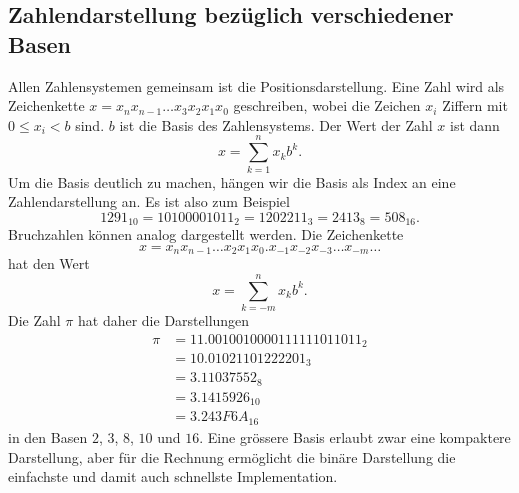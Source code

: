 \subsection{Zahlendarstellung bezüglich verschiedener Basen
\label{buch:subsection:basen}}
Allen Zahlensystemen gemeinsam ist die Positionsdarstellung.
Eine Zahl wird als Zeichenkette $x=x_nx_{n-1}\dots x_3x_2x_1x_0$
geschreiben,
wobei die Zeichen $x_i$ Ziffern mit $0 \le x_i < b$ sind.
$b$ ist die Basis des Zahlensystems.
%
Der Wert der Zahl $x$ ist dann 
\[
x
=
\sum_{k=1}^n x_kb^k.
\]
Um die Basis deutlich zu machen, 
hängen wir die Basis als Index an eine Zahlendarstellung an.
Es ist also zum Beispiel
\[
1291_{10}
=
10100001011_2
=
1202211_3
=
2413_8
=
508_{16}.
\]
Bruchzahlen können analog dargestellt werden.
%
Die Zeichenkette
\[
x = x_{n}x_{n-1}\dots x_2x_1x_0\texttt{.}x_{-1}x_{-2}x_{-3}\dots x_{-m}\dots
\]
hat den Wert
\[
x = \sum_{k=-m}^n x_kb^k.
\]
Die Zahl $\pi$ hat daher die Darstellungen
\index{$\pi$}%
\begin{align*}
\pi
&=
11.0010010000111111011011_2
\\
&=
10.01021101222201_3
\\
&=
3.11037552_8
\\
&=
3.1415926_{10}
\\
&=
3.243F6A_{16}
\end{align*}
in den Basen $2$, $3$, $8$, $10$ und $16$.
Eine grössere Basis erlaubt zwar eine kompaktere Darstellung, aber
für die Rechnung ermöglicht die binäre Darstellung die einfachste
und damit auch schnellste Implementation.

